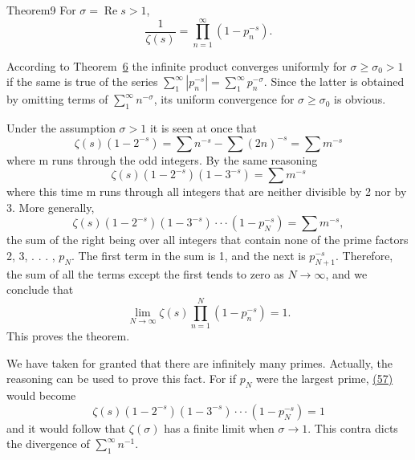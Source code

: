 \begin{originalstatement}{Theorem}{9}\label{thm:5.9}
For $\sigma = \operatorname{Re}s > 1$,
\begin{equation*}
\frac {1}{\zeta (s)} = \prod_ {n = 1} ^ {\infty} (1 - p _ {n} ^ {- s}).\tag{56}\label{eq:5.56}
\end{equation*}
\end{originalstatement}
According to Theorem~\hyperref[thm:5.6]{6} the infinite product converges uniformly for $\sigma \geq \sigma_0 > 1$ if the same is true of the series $\sum_{1}^{\infty}|p_n^{-s}| = \sum_{1}^{\infty}p_n^{-\sigma}$. Since the latter is obtained by omitting terms of $\sum_{1}^{\infty}n^{-\sigma}$, its uniform convergence for $\sigma \geq \sigma_0$ is obvious.

Under the assumption $\sigma > 1$ it is seen at once that
\begin{equation*}
\zeta (s) (1 - 2 ^ {- s}) = \sum n ^ {- s} - \sum (2 n) ^ {- s} = \sum m ^ {- s}
\end{equation*}
where m runs through the odd integers. By the same reasoning
\begin{equation*}
\zeta (s) (1 - 2 ^ {- s}) (1 - 3 ^ {- s}) = \sum m ^ {- s}
\end{equation*}
where this time m runs through all integers that are neither divisible by 2 nor by 3. More generally,
\begin{equation*}
\zeta (s) \left(1 - 2 ^ {- s}\right) \left(1 - 3 ^ {- s}\right) \cdot \cdot \cdot \left(1 - p _ {N} ^ {- s}\right) = \sum m ^ {- s},\tag{57}\label{eq:5.57}
\end{equation*}
the sum of the right being over all integers that contain none of the prime factors 2, 3, . . . , $p_N$. The first term in the sum is 1, and the next is $p_{N+1}^{-s}$. Therefore, the sum of all the terms except the first tends to zero as $N \to \infty$, and we conclude that
\begin{equation*}
\lim _ {N \rightarrow \infty} \zeta (s) \prod_ {n = 1} ^ {N} (1 - p _ {n} ^ {- s}) = 1.
\end{equation*}
This proves the theorem.

We have taken for granted that there are infinitely many primes. Actually, the reasoning can be used to prove this fact. For if $p_{N}$ were the largest prime, \hyperref[eq:5.57]{(57)} would become
\begin{equation*}
\zeta (s) (1 - 2 ^ {- s}) (1 - 3 ^ {- s}) \cdot \cdot \cdot (1 - p _ {N} ^ {- s}) = 1
\end{equation*}
and it would follow that $\zeta(\sigma)$ has a finite limit when $\sigma \to 1$. This contra%
%
dicts the divergence of $\sum_{1}^{\infty} n^{-1}$.

